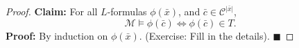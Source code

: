 \documentclass{article}
\let\models\vDash
\begin{document}
\begin{proof}
  \textbf{Claim:} For all $L$-formulas $\phi(\bar{x})$, and $\bar{c} \in \mathscr{C}^{|\bar{x}|}$,
  \begin{equation*}
    \mathcal{M} \models \phi(\bar{c}) \iff \phi(\bar{c}) \in T.
  \end{equation*}
  \textbf{Proof:} By induction on $\phi(\bar{x})$. (Exercise: Fill in the details). $\blacksquare$
\end{proof}
\printindex
\end{document}
